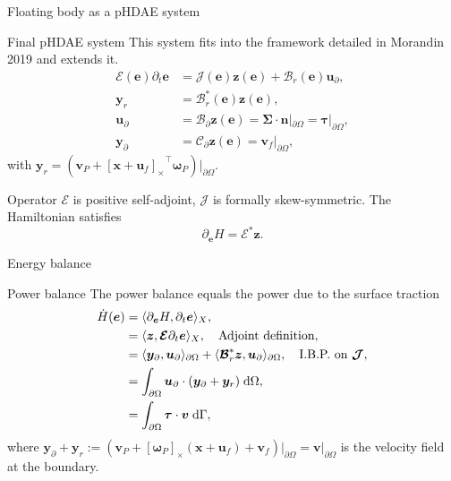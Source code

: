 \documentclass[aspectratio=169]{ISAE-Beamer}
\newcommand{\crmat}[1]{\ensuremath{\left[#1\right]_\times}}
\begin{document}
\begin{frame}{Floating body as a pHDAE system}
\begin{exampleblock}{Final pHDAE system}
	This system fits into the framework detailed in Morandin 2019  and extends it.
	\begin{equation*}
	\begin{aligned}
	\bm{\mathcal{E}}(\bm{e}) \partial_t \bm{e} &= \bm{\mathcal{J}}(\bm{e}) \bm{z}(\bm{e}) + \bm{\mathcal{B}}_r(\bm{e}) \bm{u}_\partial, \\
	\bm{y}_r &= \bm{\mathcal{B}}_r^*(\bm{e}) \bm{z}(\bm{e}), \\
	\bm{u}_\partial &= \bm{\mathcal{B}}_{\partial} \bm{z}(\bm{e}) =  \bm\Sigma \cdot \bm{n}|_{\partial \Omega} = \bm\tau|_{\partial \Omega}, \\
	\bm{y}_\partial &= \bm{\mathcal{C}}_{\partial} \bm{z}(\bm{e}) = \bm{v}_f|_{\partial \Omega},
	\end{aligned}
	\end{equation*}
	with $\bm{y}_r = (\bm{v}_P + \crmat{\bm{x}+\bm{u}_f}^\top \bm{\omega}_P)\vert_{\partial\Omega}$.
\end{exampleblock}
Operator $\bm{\mathcal{E}}$ is positive self-adjoint, $\bm{\mathcal{J}}$ is formally skew-symmetric.
The Hamiltonian  satisfies 
\begin{equation*}
\partial_{\bm{e}} H = \bm{\mathcal{E}}^* \bm{z}.
\end{equation*}
\end{frame}

\begin{frame}{Energy balance}

\begin{exampleblock}{Power balance}
	The power balance equals the power due to the surface traction
	\begin{equation*}
	\setlength{\abovedisplayskip}{5pt}
	\setlength{\belowdisplayskip}{5pt}
	\begin{aligned}
	\dot{H}(\bm{e}) &= \langle \partial_{\bm{e}} H, \partial_t {\bm{e}} \rangle_{X},\\
	&= \langle \bm{z}, \bm{\mathcal{E}} \partial_t {\bm{e}} \rangle_{{X}}, \quad \text{Adjoint definition},  \\
	&= \langle \bm{y}_\partial,  \bm{u}_\partial \rangle_{\partial\Omega} + \langle \bm{\mathcal{B}}_r^* \bm{z}, \bm{u}_\partial \rangle_{\partial\Omega}, \quad \text{I.B.P. on } \bm{\mathcal{J}}, \\
	&=  \int_{\partial \Omega} \bm{u}_\partial \cdot (\bm{y}_\partial + \bm{y}_r)  \d{\Omega}, \\
	&= \int_{\partial \Omega} \bm\tau \cdot \bm{v} \d\Gamma,  \\
	\end{aligned}
	\end{equation*}
	where $\bm{y}_\partial + \bm{y}_r := (\bm{v}_P + \crmat{\bm{\omega}_P} (\bm{x}+\bm{u}_f) + {\bm{v}}_f)\vert_{\partial\Omega} = \bm{v}\vert_{\partial\Omega}$ is the velocity field at the boundary.
\end{exampleblock}

\end{frame}
\end{document}
